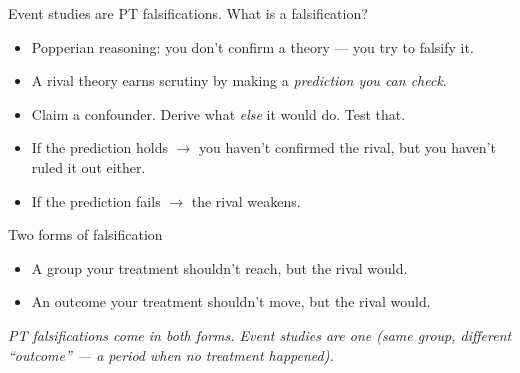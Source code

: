 \documentclass[aspectratio=169,11pt]{beamer}
\begin{document}

\begin{frame}{Event studies are PT falsifications. What is a falsification?}
\vspace{0.6em}
\begin{itemize}\setlength\itemsep{0.5em}
  \item Popperian reasoning: \;you don't confirm a theory --- you try to falsify it.
  \item A rival theory earns scrutiny by making a \textit{prediction you can check}.
  \item Claim a confounder. Derive what \textit{else} it would do. Test that.
  \item If the prediction holds $\to$ you haven't confirmed the rival, but you haven't ruled it out either.
  \item If the prediction fails $\to$ the rival weakens.
\end{itemize}
\vspace{0.5em}
\end{frame}

\begin{frame}{Two forms of falsification}
\vspace{0.6em}
\begin{itemize}\setlength\itemsep{0.7em}
  \item {} A group your treatment shouldn't reach, but the rival would. \\
  \item {} An outcome your treatment shouldn't move, but the rival would. \\
\end{itemize}
\vspace{0.6em}
\begin{center}
\small\color{warmgray}\itshape PT falsifications come in both forms. \;Event studies are one (same group, different ``outcome'' --- a period when no treatment happened).
\end{center}
\end{frame}
\end{document}
